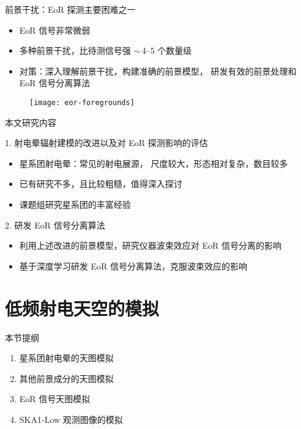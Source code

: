 \documentclass{beamer}
\begin{document}
\begin{frame}{前景干扰：EoR 探测主要困难之一}
  \begin{itemize}
    \item EoR 信号非常微弱
    \item \alert{多种前景干扰}，比待测信号强 $\sim$\,4--5 个数量级
    \item \alert{对策}：深入理解前景干扰，构建准确的前景模型，
      研发有效的前景处理和 EoR 信号分离算法
  \end{itemize}

  \vspace{-1ex}
  \begin{figure}
    \centering
    \texttt{[image: eor-foregrounds]}
  \end{figure}
\end{frame}

\begin{frame}{本文研究内容}
  \begin{alertblock}{1. 射电晕辐射建模的改进以及对 EoR 探测影响的评估}
    \begin{itemize}
      \item 星系团射电晕：常见的射电展源，
        尺度较大，形态相对复杂，数目较多
      \item 已有研究不多，且比较粗糙，值得深入探讨
      \item 课题组研究星系团的丰富经验
    \end{itemize}
  \end{alertblock}
  \begin{alertblock}{2. 研发 EoR 信号分离算法}
    \begin{itemize}
      \item 利用上述改进的前景模型，研究仪器波束效应对 EoR 信号分离的影响
      \item 基于深度学习研发 EoR 信号分离算法，克服波束效应的影响
    \end{itemize}
  \end{alertblock}
\end{frame}


\section{低频射电天空的模拟}

\begin{frame}
  \begin{block}{本节提纲}
  \begin{enumerate}
    \item 星系团射电晕的天图模拟
    \item 其他前景成分的天图模拟
    \item EoR 信号天图模拟
    \item SKA1-Low 观测图像的模拟
  \end{enumerate}
  \end{block}
\end{frame}
\end{document}
